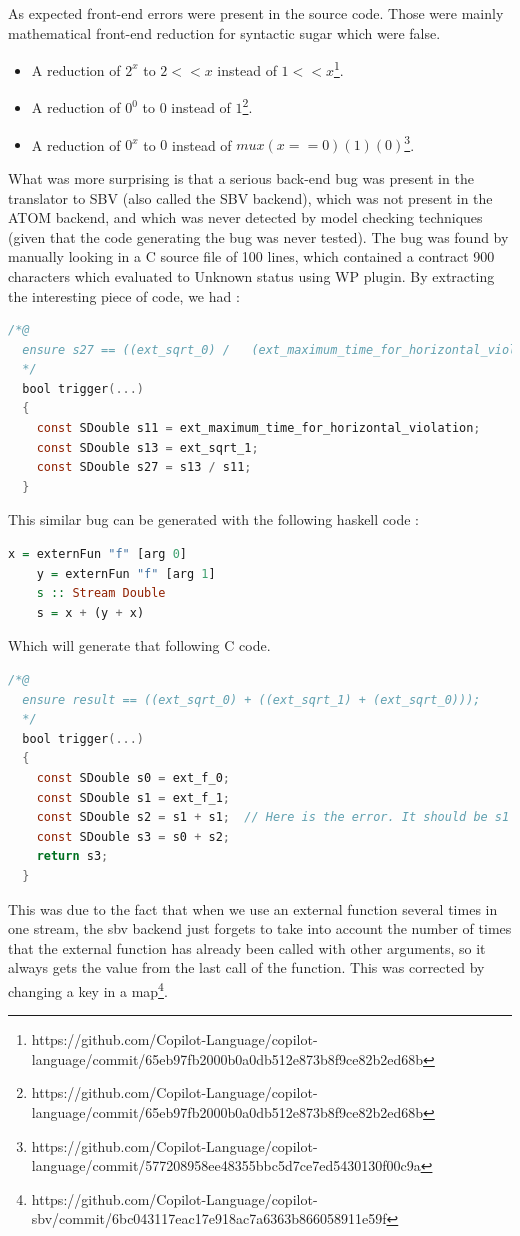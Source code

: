 \documentclass[a4paper,11pt,final]{article}
\begin{document}
  As expected front-end errors were present in the source code. Those were mainly mathematical front-end reduction for syntactic sugar which were false.
  
 \begin{itemize}
 	\item A reduction of $2^x$ to $2 << x$ instead of $1 << x$\footnote{https://github.com/Copilot-Language/copilot-language/commit/65eb97fb2000b0a0db512e873b8f9ce82b2ed68b}.
 	\item A reduction of $0^0$ to $0$ instead of $1$\footnote{https://github.com/Copilot-Language/copilot-language/commit/65eb97fb2000b0a0db512e873b8f9ce82b2ed68b}.
 	\item A reduction of $0^x$ to $0$ instead of $mux (x==0) (1) (0)$\footnote{https://github.com/Copilot-Language/copilot-language/commit/577208958ee48355bbc5d7ce7ed5430130f00c9a}.
 \end{itemize}
  
  What was more surprising is that a serious back-end bug was present in the translator to SBV (also called the SBV backend), which was not present in the ATOM backend, and which was never detected by model checking techniques (given that the code generating the bug was never tested). The bug was found by manually looking in a C source file of 100 lines, which contained a contract 900 characters which evaluated to Unknown status using WP plugin. By extracting the interesting piece of code, we had :
  \begin{lstlisting}[language=C, keywordstyle=\color{blue}]
  /*@
  ensure s27 == ((ext_sqrt_0) /   (ext_maximum_time_for_horizontal_violation));
  */
  bool trigger(...)
  {
    const SDouble s11 = ext_maximum_time_for_horizontal_violation;
    const SDouble s13 = ext_sqrt_1;
    const SDouble s27 = s13 / s11;
  }  \end{lstlisting}
  This similar bug can be generated with the following haskell code :
  \begin{lstlisting}[language=Haskell]
    x = externFun "f" [arg 0]
    y = externFun "f" [arg 1]
  	s :: Stream Double
  	s = x + (y + x)
  \end{lstlisting}
  Which will generate that following C code.
  \begin{lstlisting}[language=C, keywordstyle=\color{blue}]
  /*@
  ensure result == ((ext_sqrt_0) + ((ext_sqrt_1) + (ext_sqrt_0)));
  */
  bool trigger(...)
  {
    const SDouble s0 = ext_f_0;
    const SDouble s1 = ext_f_1;
    const SDouble s2 = s1 + s1;  // Here is the error. It should be s1 + s0;
    const SDouble s3 = s0 + s2;
    return s3;
  }  \end{lstlisting}
  This was due to the fact that when we use an external function several times in one stream, the sbv backend just forgets to take into account the number of times that the external function has already been called with other arguments, so it always gets the value from the last call of the function. This was corrected by changing a key in a map\footnote{https://github.com/Copilot-Language/copilot-sbv/commit/6bc043117eac17e918ac7a6363b866058911e59f}. 
  
\end{document}
